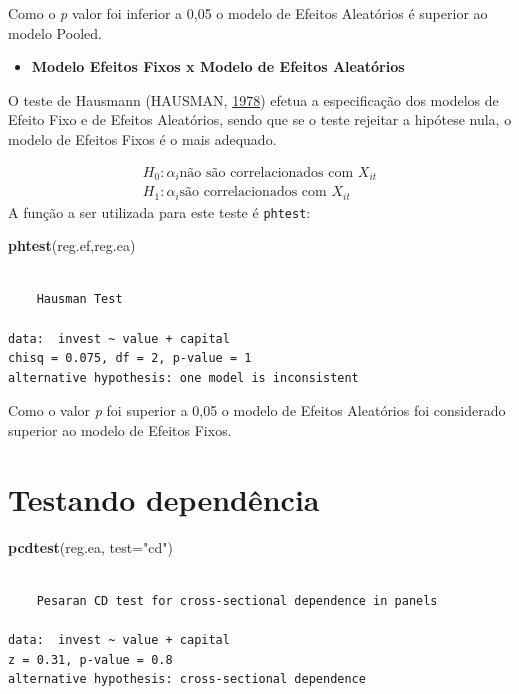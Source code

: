 \documentclass[12pt,brazil,oneside]{book}
\newenvironment{Shaded}{\begin{snugshade}}{\end{snugshade}}
\newcommand{\DataTypeTok}[1]{\textcolor[rgb]{0.13,0.29,0.53}{#1}}
\newcommand{\KeywordTok}[1]{\textcolor[rgb]{0.13,0.29,0.53}{\textbf{#1}}}
\newcommand{\NormalTok}[1]{#1}
\newcommand{\StringTok}[1]{\textcolor[rgb]{0.31,0.60,0.02}{#1}}
\providecommand{\tightlist}{%
  \setlength{\itemsep}{0pt}\setlength{\parskip}{0pt}}
\begin{document}
Como o \emph{p} valor foi inferior a 0,05 o modelo de Efeitos Aleatórios
é superior ao modelo Pooled.

\begin{itemize}
\tightlist
\item
  \textbf{Modelo Efeitos Fixos x Modelo de Efeitos Aleatórios}
\end{itemize}

O teste de Hausmann (HAUSMAN, \protect\hyperlink{ref-hausman1978}{1978})
efetua a especificação dos modelos de Efeito Fixo e de Efeitos
Aleatórios, sendo que se o teste rejeitar a hipótese nula, o modelo de
Efeitos Fixos é o mais adequado.

\[
 \begin{matrix}
H_0: \alpha_{i} \text{não são correlacionados com } X_{it} \\
H_1: \alpha_{i} \text{são correlacionados com } X_{it}
 \end{matrix}
\] A função a ser utilizada para este teste é \texttt{phtest}:

\begin{Shaded}
\begin{Highlighting}[]
\KeywordTok{phtest}\NormalTok{(reg.ef,reg.ea)}
\end{Highlighting}
\end{Shaded}

\begin{verbatim}

    Hausman Test

data:  invest ~ value + capital
chisq = 0.075, df = 2, p-value = 1
alternative hypothesis: one model is inconsistent
\end{verbatim}

Como o valor \emph{p} foi superior a 0,05 o modelo de Efeitos Aleatórios
foi considerado superior ao modelo de Efeitos Fixos.

\hypertarget{testando-dependencia}{%
\section{Testando dependência}\label{testando-dependencia}}

\begin{Shaded}
\begin{Highlighting}[]
\KeywordTok{pcdtest}\NormalTok{(reg.ea, }\DataTypeTok{test=}\StringTok{"cd"}\NormalTok{)}
\end{Highlighting}
\end{Shaded}

\begin{verbatim}

    Pesaran CD test for cross-sectional dependence in panels

data:  invest ~ value + capital
z = 0.31, p-value = 0.8
alternative hypothesis: cross-sectional dependence
\end{verbatim}
\end{document}
